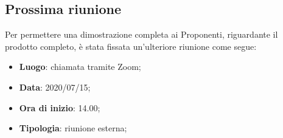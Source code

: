 \subsection{Prossima riunione}
Per permettere una dimostrazione completa ai Proponenti, riguardante il prodotto completo, è stata fissata un'ulteriore riunione come segue: 
\begin{itemize}
	\item \textbf{Luogo}: chiamata tramite Zoom; 
	\item \textbf{Data}: 2020/07/15; 
	\item \textbf{Ora di inizio}: 14.00; 
	\item \textbf{Tipologia}: riunione esterna; 
\end{itemize}